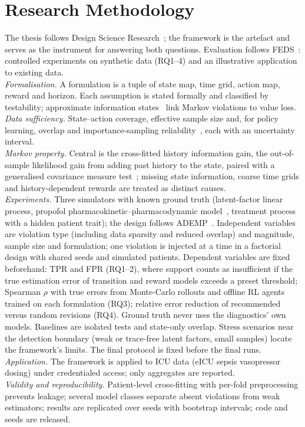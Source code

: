\documentclass[runningheads]{llncs}
\begin{document}
\section{Research Methodology}
The thesis follows Design Science Research~\cite{Hevner2004,Peffers2007}; the framework is the artefact and serves as the instrument for answering both questions. Evaluation follows FEDS~\cite{Venable2016}: controlled experiments on synthetic data (RQ1--4) and an illustrative application to existing data. \\
\emph{Formalisation.} A formulation is a tuple of state map, time grid, action map, reward and horizon. Each assumption is stated formally and classified by testability; approximate information states~\cite{Subramanian2022} link Markov violations to value loss. \\
\emph{Data sufficiency.} State--action coverage, effective sample size and, for policy learning, overlap and importance-sampling reliability~\cite{Petersen2012}, each with an uncertainty interval. \\
\emph{Markov property.} Central is the cross-fitted history information gain, the out-of-sample likelihood gain from adding past history to the state, paired with a generalised covariance measure test~\cite{Shah2020}; missing state information, coarse time grids and history-dependent rewards are treated as distinct causes. \\
\emph{Experiments.} Three simulators with known ground truth (latent-factor linear process, propofol pharmacokinetic--pharmacodynamic model~\cite{Schnider1998}, treatment process with a hidden patient trait); the design follows ADEMP~\cite{Morris2019}. Independent variables are violation type (including data sparsity and reduced overlap) and magnitude, sample size and formulation; one violation is injected at a time in a factorial design with shared seeds and simulated patients. Dependent variables are fixed beforehand: TPR and FPR (RQ1--2), where support counts as insufficient if the true estimation error of transition and reward models exceeds a preset threshold; Spearman $\rho$ with true errors from Monte-Carlo rollouts and offline RL agents trained on each formulation (RQ3); relative error reduction of recommended versus random revisions (RQ4). Ground truth never uses the diagnostics' own models. Baselines are isolated tests and state-only overlap. Stress scenarios near the detection boundary (weak or trace-free latent factors, small samples) locate the framework's limits. The final protocol is fixed before the final runs. \\
\emph{Application.} The framework is applied to ICU data (eICU sepsis vasopressor dosing) under credentialed access; only aggregates are reported. \\
\emph{Validity and reproducibility.} Patient-level cross-fitting with per-fold preprocessing prevents leakage; several model classes separate absent violations from weak estimators; results are replicated over seeds with bootstrap intervals; code and seeds are released.
\end{document}
